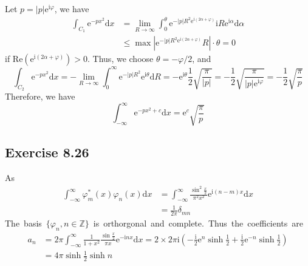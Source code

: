 \documentclass[]{ctexart}
\begin{document}
\begin{figure}[h]
	
\end{figure}

Let $p=|p|\mathrm{e}^{\mathrm{i}\varphi}$, we have  
\begin{align*}
\int_{C_1}\mathrm{e}^{-px^2}\mathrm{d}x&=\lim_{R\to\infty}\int_0^\theta\mathrm{e}^{-|p|R^2\mathrm{e}^{\mathrm{i}(2\alpha+\varphi)}}\mathrm{i}R\mathrm{e}^{\mathrm{i}\alpha}\mathrm{d}\alpha\\
&\le \max\left|\mathrm{e}^{-|p|R^2\mathrm{e}^{\mathrm{i}(2\alpha+\varphi)}}R\right|\cdot\theta=0
\end{align*}
if $\text{Re}(\mathrm{e}^{\mathrm{i}(2\alpha+\varphi)})>0$. Thus, we choose $\theta=-\varphi/2$, and 
\begin{equation*}
\int_{C_2}\mathrm{e}^{-px^2}\mathrm{d}x=-\lim_{R\to\infty}\int_0^\infty\mathrm{e}^{-|p|R^2}\mathrm{e}^{\mathrm{i}\theta}\mathrm{d}R=-\mathrm{e}^{\mathrm{i}\theta}\frac{1}{2}\sqrt{\frac{\pi}{|p|}}=-\frac{1}{2}\sqrt{\frac{\pi}{|p|\mathrm{e}^{\mathrm{i}\varphi}}}=-\frac{1}{2}\sqrt{\frac{\pi}{p}}
\end{equation*}
Therefore, we have 
\begin{equation*}
\int_{-\infty}^{\infty}\mathrm{e}^{-px^2+c}\mathrm{d}x=\mathrm{e}^c\sqrt{\frac{\pi}{p}}
\end{equation*}

\subsection{Exercise 8.26}
	As 
	\begin{align*}
	\int_{-\infty}^\infty\varphi_m^*(x)\varphi_n(x)\mathrm{d}x&=\int_{-\infty}^\infty\frac{\sin^2\frac{x}{2}}{\pi^2 x^2}\mathrm{e}^{\mathrm{i}(n-m)x}\mathrm{d}x\\
	&=\frac{1}{2\pi}\delta_{mn}
	\end{align*}
	The basis $\{\varphi_n,n\in\mathbb Z\}$ is orthorgonal and complete. Thus the coefficients are 
	\begin{equation*}
	\begin{aligned}
	a_n&=2\pi\int_{-\infty}^\infty\frac{1}{1+x^2}\frac{\sin\frac{x}{2}}{\pi x}\mathrm{e}^{-\mathrm{i}nx}\mathrm{d}x=2\times2\pi\mathrm{i}\left(-\frac{\mathrm{i}}{2}\mathrm{e}^n\sinh\frac{1}{2}+\frac{\mathrm{i}}{2}\mathrm{e}^{-n}\sinh\frac{1}{2}\right)\\
	&=4\pi\sinh\frac{1}{2}\sinh \!n
	\end{aligned}
	\end{equation*}
	
\end{document}
